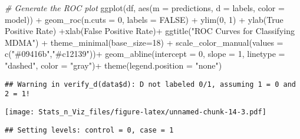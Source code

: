 \documentclass[
]{article}
\newenvironment{Shaded}{\begin{snugshade}}{\end{snugshade}}
\newcommand{\AttributeTok}[1]{\textcolor[rgb]{0.77,0.63,0.00}{#1}}
\newcommand{\CommentTok}[1]{\textcolor[rgb]{0.56,0.35,0.01}{\textit{#1}}}
\newcommand{\ConstantTok}[1]{\textcolor[rgb]{0.00,0.00,0.00}{#1}}
\newcommand{\DecValTok}[1]{\textcolor[rgb]{0.00,0.00,0.81}{#1}}
\newcommand{\FunctionTok}[1]{\textcolor[rgb]{0.00,0.00,0.00}{#1}}
\newcommand{\NormalTok}[1]{#1}
\newcommand{\OtherTok}[1]{\textcolor[rgb]{0.56,0.35,0.01}{#1}}
\newcommand{\SpecialCharTok}[1]{\textcolor[rgb]{0.00,0.00,0.00}{#1}}
\newcommand{\StringTok}[1]{\textcolor[rgb]{0.31,0.60,0.02}{#1}}
\begin{document}
\begin{Shaded}
\begin{Highlighting}[]
\CommentTok{\# Generate the ROC plot}
\FunctionTok{ggplot}\NormalTok{(df, }\FunctionTok{aes}\NormalTok{(}\AttributeTok{m =}\NormalTok{ predictions, }\AttributeTok{d =}\NormalTok{ labels, }\AttributeTok{color =}\NormalTok{ model)) }\SpecialCharTok{+} 
  \FunctionTok{geom\_roc}\NormalTok{(}\AttributeTok{n.cuts =} \DecValTok{0}\NormalTok{, }\AttributeTok{labels =} \ConstantTok{FALSE}\NormalTok{) }\SpecialCharTok{+} 
  \FunctionTok{ylim}\NormalTok{(}\DecValTok{0}\NormalTok{, }\DecValTok{1}\NormalTok{) }\SpecialCharTok{+} \FunctionTok{ylab}\NormalTok{(}\StringTok{\textquotesingle{}True Positive Rate\textquotesingle{}}\NormalTok{) }\SpecialCharTok{+}\FunctionTok{xlab}\NormalTok{(}\StringTok{\textquotesingle{}False Positive Rate\textquotesingle{}}\NormalTok{)}\SpecialCharTok{+}
  \FunctionTok{ggtitle}\NormalTok{(}\StringTok{"ROC Curves for Classifying MDMA"}\NormalTok{) }\SpecialCharTok{+} 
  \FunctionTok{theme\_minimal}\NormalTok{(}\AttributeTok{base\_size=}\DecValTok{18}\NormalTok{) }\SpecialCharTok{+} 
  \FunctionTok{scale\_color\_manual}\NormalTok{(}\AttributeTok{values =} \FunctionTok{c}\NormalTok{(}\StringTok{"\#09416b"}\NormalTok{,}\StringTok{"\#c12139"}\NormalTok{))}\SpecialCharTok{+}
  \FunctionTok{geom\_abline}\NormalTok{(}\AttributeTok{intercept =} \DecValTok{0}\NormalTok{, }\AttributeTok{slope =} \DecValTok{1}\NormalTok{, }\AttributeTok{linetype =} \StringTok{"dashed"}\NormalTok{, }\AttributeTok{color =} \StringTok{"gray"}\NormalTok{)}\SpecialCharTok{+}
  \FunctionTok{theme}\NormalTok{(}\AttributeTok{legend.position =} \StringTok{"none"}\NormalTok{)}
\end{Highlighting}
\end{Shaded}

\begin{verbatim}
## Warning in verify_d(data$d): D not labeled 0/1, assuming 1 = 0 and 2 = 1!
\end{verbatim}

\texttt{[image: Stats\_n\_Viz\_files/figure-latex/unnamed-chunk-14-3.pdf]}

\begin{Shaded}
\end{Shaded}

\begin{verbatim}
## Setting levels: control = 0, case = 1
\end{verbatim}
\end{document}
